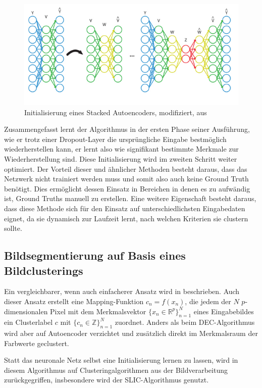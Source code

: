 \begin{figure}[h!]
	\centering
	\includegraphics[width=.8\textwidth,keepaspectratio]{images/BK15_01.png}
	\caption{Initialisierung eines Stacked Autoencoders, modifiziert, aus \cite{berniker_15}}
	\label{fig:sae}
\end{figure}

Zusammengefasst lernt der Algorithmus in der ersten Phase seiner Ausführung, wie er trotz einer Dropout-Layer die ursprüngliche Eingabe bestmöglich wiederherstellen kann, er lernt also wie signifikant bestimmte Merkmale zur Wiederherstellung sind. Diese Initialisierung wird im zweiten Schritt weiter optimiert.
Der Vorteil dieser und ähnlicher Methoden besteht daraus, dass das Netzwerk nicht trainiert werden muss und somit also auch keine Ground Truth benötigt. Dies ermöglicht dessen Einsatz in Bereichen in denen es zu aufwändig ist, Ground Truths manuell zu erstellen. Eine weitere Eigenschaft besteht daraus, dass diese Methode sich für den Einsatz auf unterschiedlichsten Eingabedaten eignet, da sie dynamisch zur Laufzeit lernt, nach welchen Kriterien sie clustern sollte.

\subsection{Bildsegmentierung auf Basis eines Bildclusterings}
\label{ssec:kanezaki}
Ein vergleichbarer, wenn auch einfacherer Ansatz wird in \cite{kanezaki_18} beschrieben. Auch dieser Ansatz erstellt eine Mapping-Funktion $c_n=f(x_n)$, die jedem der $N$ $p$-dimensionalen Pixel mit dem Merkmalsvektor $\{x_n\in\mathbb{R}^p\}_{n=1}^N$ eines Eingabebildes ein Clusterlabel $c$ mit $\{c_n\in\mathbb{Z}\}_{n=1}^N$ zuordnet. Anders als beim DEC-Algorithmus wird aber auf Autoencoder verzichtet und zusätzlich direkt im Merkmalsraum der Farbwerte geclustert.

Statt das neuronale Netz selbst eine Initialisierung lernen zu lassen, wird in diesem Algorithmus auf Clusteringalgorithmen aus der Bildverarbeitung zurückgegriffen, insbesondere wird der SLIC-Algorithmus \cite{achanta_10} genutzt.

